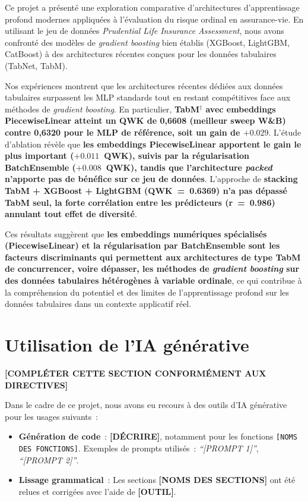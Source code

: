 \documentclass[conference]{IEEEtran}
\begin{document}
Ce projet a présenté une exploration comparative d'architectures d'apprentissage profond
modernes appliquées à l'évaluation du risque ordinal en assurance-vie. En utilisant le
jeu de données \textit{Prudential Life Insurance Assessment}, nous avons confronté des
modèles de \textit{gradient boosting} bien établis (XGBoost, LightGBM, CatBoost) à des
architectures récentes conçues pour les données tabulaires (TabNet, TabM).

Nos expériences montrent que les architectures récentes dédiées aux données tabulaires
surpassent les MLP standards tout en restant compétitives face aux méthodes de
\textit{gradient boosting}. En particulier,
\textbf{TabM$^\dagger$ avec embeddings PiecewiseLinear atteint un QWK de 0,6608 (meilleur
sweep W\&B) contre 0,6320 pour le MLP de référence, soit un gain de $+0.029$}.
L'étude d'ablation révèle que \textbf{les embeddings PiecewiseLinear apportent le gain le
plus important ($+0.011$~QWK), suivis par la régularisation BatchEnsemble ($+0.008$~QWK),
tandis que l'architecture \textit{packed} n'apporte pas de bénéfice sur ce jeu de données}.
L'approche de \textbf{stacking TabM + XGBoost + LightGBM (QWK~=~0.6369) n'a pas dépassé
TabM seul, la forte corrélation entre les prédicteurs (r~=~0.986) annulant tout effet de
diversité}.

Ces résultats suggèrent que \textbf{les embeddings numériques spécialisés (PiecewiseLinear)
et la régularisation par BatchEnsemble sont les facteurs discriminants qui permettent aux
architectures de type TabM de concurrencer, voire dépasser, les méthodes de \textit{gradient
boosting} sur des données tabulaires hétérogènes à variable ordinale}, ce qui contribue à la compréhension
du potentiel et des limites de l'apprentissage profond sur les données tabulaires dans un
contexte applicatif réel.

\section{Utilisation de l'IA générative}

\textbf{[COMPLÉTER CETTE SECTION CONFORMÉMENT AUX DIRECTIVES]}

Dans le cadre de ce projet, nous avons eu recours à des outils d'IA générative pour les
usages suivants~:

\begin{itemize}
  \item \textbf{Génération de code}~: \textbf{[DÉCRIRE]}, notamment pour les fonctions
        \texttt{[NOMS DES FONCTIONS]}. Exemples de prompts utilisés~: \textit{``[PROMPT 1]''},
        \textit{``[PROMPT 2]''}.
  \item \textbf{Lissage grammatical}~: Les sections \textbf{[NOMS DES SECTIONS]} ont été
        relues et corrigées avec l'aide de \textbf{[OUTIL]}.
\end{itemize}
\end{document}
